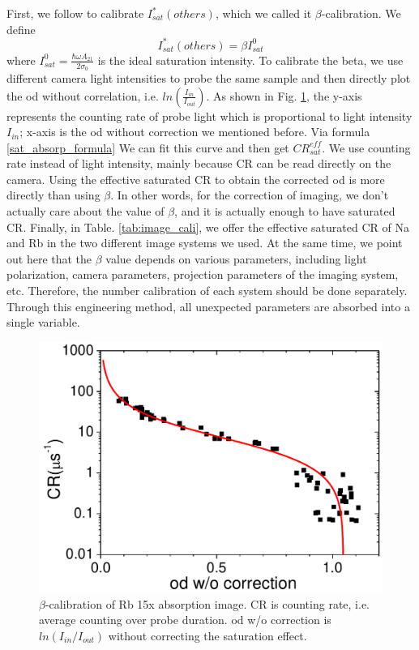 First, we follow \cite{reinaudi2007strong} to calibrate $I^*_{sat}(others)$, which we called it $\beta$-calibration. We define
\begin{equation}
I^*_{sat}(others)=\beta I^0_{sat}
\end{equation}
where $I^0_{sat}=\frac{\hbar \omega A_{21}}{2 \sigma_0}$ is the ideal saturation intensity. To calibrate the beta, we use different camera light intensities to probe the same sample and then directly plot the od without correlation, i.e. $ln(\frac{I_{in}}{I_{out}})$. As shown in Fig. \ref{Image_beta_calibration}, the y-axis represents the counting rate of probe light which is proportional to light intensity $I_{in}$; x-axis is the od without correction we mentioned before. Via formula \ref{sat_absorp_formula} We can fit this curve and then get $CR_{sat}^{eff}$. We use counting rate instead of light intensity, mainly because CR can be read directly on the camera. Using the effective saturated CR to obtain the corrected od is more directly than using $\beta$. In other words, for the correction of imaging, we don't actually care about the value of $\beta$, and it is actually enough to have saturated CR. Finally, in Table. \ref{tab:image_cali}, we offer the effective saturated CR  of Na and Rb in the two different image systems we used. At the same time, we point out here that the $\beta$ value depends on various parameters, including light polarization, camera parameters, projection parameters of the imaging system, etc. Therefore, the number calibration of each system should be done separately. Through this engineering method, all unexpected parameters are absorbed into a single variable.

\begin{figure}[htb]
\begin{center}
\includegraphics[width = 0.8\linewidth]{figures/Image_beta_calibration.pdf}
\end{center}
\caption[$\beta$-calibration of Rb 15x absorption image]{$\beta$-calibration of Rb 15x absorption image. CR is counting rate, i.e. average counting over probe duration. od w/o correction is $ln(I_{in}/I_{out})$ without correcting the saturation effect.}
\label{Image_beta_calibration}
\end{figure}

